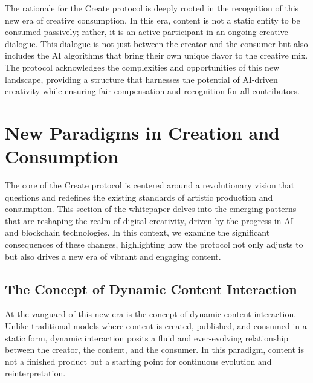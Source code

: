 \documentclass[12pt,a4paper]{article}
\begin{document}
The rationale for the Create protocol is deeply rooted in the recognition of this new era of creative consumption. In this era, content is not a static entity to be consumed passively; rather, it is an active participant in an ongoing creative dialogue. This dialogue is not just between the creator and the consumer but also includes the AI algorithms that bring their own unique flavor to the creative mix. The protocol acknowledges the complexities and opportunities of this new landscape, providing a structure that harnesses the potential of AI-driven creativity while ensuring fair compensation and recognition for all contributors.

\noindent{}

\pagebreak

\section{New Paradigms in Creation and Consumption}\label{sec:new-paradigm}

The core of the Create protocol is centered around a revolutionary vision that questions and redefines the existing standards of artistic production and consumption. This section of the whitepaper delves into the emerging patterns that are reshaping the realm of digital creativity, driven by the progress in AI and blockchain technologies. In this context, we examine the significant consequences of these changes, highlighting how the protocol not only adjusts to but also drives a new era of vibrant and engaging content.

\subsection{The Concept of Dynamic Content Interaction}

At the vanguard of this new era is the concept of dynamic content interaction. Unlike traditional models where content is created, published, and consumed in a static form, dynamic interaction posits a fluid and ever-evolving relationship between the creator, the content, and the consumer. In this paradigm, content is not a finished product but a starting point for continuous evolution and reinterpretation.
\end{document}
